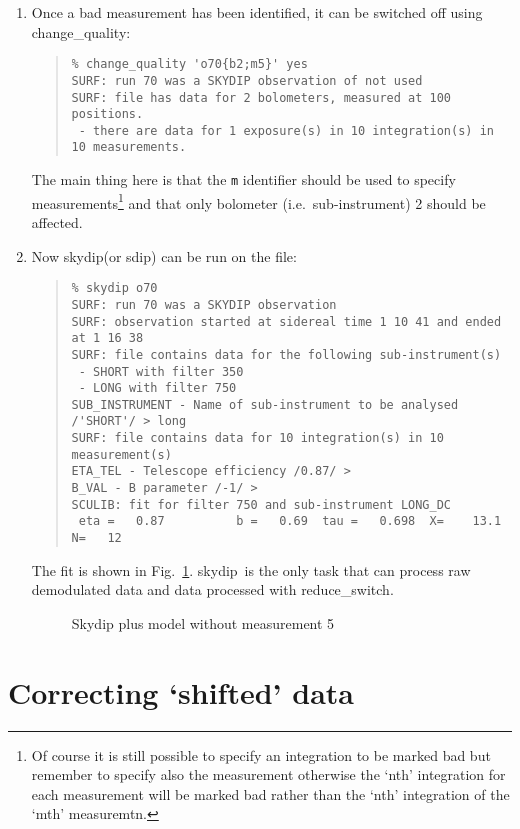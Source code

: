 \documentclass[twoside,11pt]{article}
\newcommand{\task}[1]{{\sf #1}}
\newcommand{\chgqual}{\htmlref{\task{change\_quality}}{CHANGE_QUALITY}}
\newcommand{\resw}{\htmlref{\task{reduce\_switch}}{REDUCE_SWITCH}}
\newcommand{\skydip}{\htmlref{\task{skydip}}{SKYDIP}}
\newcommand{\sdip}{\htmlref{\task{sdip}}{SDIP}}
\newenvironment{myquote}{\begin{quote}\begin{small}}{\end{small}\end{quote}}
\newcommand{\htmlref}[2]{#1}
\begin{document}
\begin{enumerate}
\item Once a bad measurement has been identified, it can be switched off using 
\chgqual:
\begin{myquote}
\begin{verbatim}
% change_quality 'o70{b2;m5}' yes
SURF: run 70 was a SKYDIP observation of not used
SURF: file has data for 2 bolometers, measured at 100 positions.
 - there are data for 1 exposure(s) in 10 integration(s) in 10 measurements.
\end{verbatim}
\end{myquote}
The main thing here is that the \texttt{m} identifier should be used to specify
measurements\footnote{Of course it is still possible to specify an integration 
to be marked bad but remember to specify also the measurement otherwise the 
`nth' integration for each measurement will be marked bad rather than the
`nth' integration of the `mth' measuremtn.} and that only bolometer (i.e.\
sub-instrument) 2 should be affected. 




\item Now \skydip (or \sdip) can be run on the file:
\begin{myquote}
\begin{verbatim}
% skydip o70
SURF: run 70 was a SKYDIP observation
SURF: observation started at sidereal time 1 10 41 and ended at 1 16 38
SURF: file contains data for the following sub-instrument(s)
 - SHORT with filter 350
 - LONG with filter 750
SUB_INSTRUMENT - Name of sub-instrument to be analysed /'SHORT'/ > long
SURF: file contains data for 10 integration(s) in 10 measurement(s)
ETA_TEL - Telescope efficiency /0.87/ > 
B_VAL - B parameter /-1/ > 
SCULIB: fit for filter 750 and sub-instrument LONG_DC
 eta =   0.87          b =   0.69  tau =   0.698  X=    13.1  N=   12
\end{verbatim}
\end{myquote}
The fit is shown in Fig.\ \ref{fitsdip}. \skydip\ is the only task that can
process raw demodulated data and data processed with \resw.
\begin{figure}
\begin{center}
\caption{Skydip plus model without measurement 5}
\label{fitsdip}
\end{center}
\end{figure}


\end{enumerate}

\section{Correcting `shifted' data}
\end{document}
